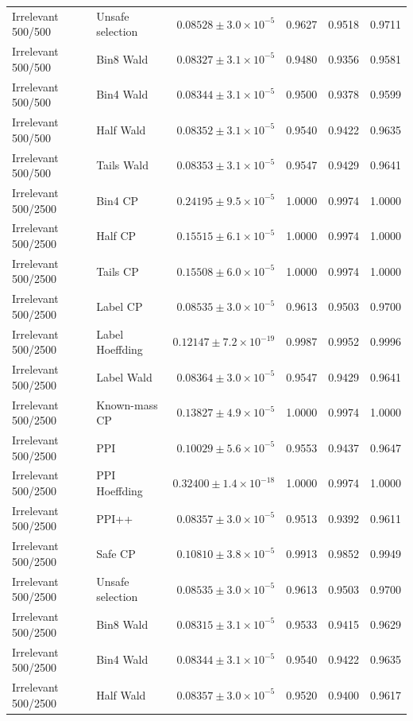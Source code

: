 \begin{longtable}{llrrrr}
Irrelevant 500/500 & Unsafe selection & $0.08528\pm 3.0\times 10^{-5}$ & 0.9627 & 0.9518 & 0.9711 \\
Irrelevant 500/500 & Bin8 Wald & $0.08327\pm 3.1\times 10^{-5}$ & 0.9480 & 0.9356 & 0.9581 \\
Irrelevant 500/500 & Bin4 Wald & $0.08344\pm 3.1\times 10^{-5}$ & 0.9500 & 0.9378 & 0.9599 \\
Irrelevant 500/500 & Half Wald & $0.08352\pm 3.1\times 10^{-5}$ & 0.9540 & 0.9422 & 0.9635 \\
Irrelevant 500/500 & Tails Wald & $0.08353\pm 3.1\times 10^{-5}$ & 0.9547 & 0.9429 & 0.9641 \\
Irrelevant 500/2500 & Bin4 CP & $0.24195\pm 9.5\times 10^{-5}$ & 1.0000 & 0.9974 & 1.0000 \\
Irrelevant 500/2500 & Half CP & $0.15515\pm 6.1\times 10^{-5}$ & 1.0000 & 0.9974 & 1.0000 \\
Irrelevant 500/2500 & Tails CP & $0.15508\pm 6.0\times 10^{-5}$ & 1.0000 & 0.9974 & 1.0000 \\
Irrelevant 500/2500 & Label CP & $0.08535\pm 3.0\times 10^{-5}$ & 0.9613 & 0.9503 & 0.9700 \\
Irrelevant 500/2500 & Label Hoeffding & $0.12147\pm 7.2\times 10^{-19}$ & 0.9987 & 0.9952 & 0.9996 \\
Irrelevant 500/2500 & Label Wald & $0.08364\pm 3.0\times 10^{-5}$ & 0.9547 & 0.9429 & 0.9641 \\
Irrelevant 500/2500 & Known-mass CP & $0.13827\pm 4.9\times 10^{-5}$ & 1.0000 & 0.9974 & 1.0000 \\
Irrelevant 500/2500 & PPI & $0.10029\pm 5.6\times 10^{-5}$ & 0.9553 & 0.9437 & 0.9647 \\
Irrelevant 500/2500 & PPI Hoeffding & $0.32400\pm 1.4\times 10^{-18}$ & 1.0000 & 0.9974 & 1.0000 \\
Irrelevant 500/2500 & PPI++ & $0.08357\pm 3.0\times 10^{-5}$ & 0.9513 & 0.9392 & 0.9611 \\
Irrelevant 500/2500 & Safe CP & $0.10810\pm 3.8\times 10^{-5}$ & 0.9913 & 0.9852 & 0.9949 \\
Irrelevant 500/2500 & Unsafe selection & $0.08535\pm 3.0\times 10^{-5}$ & 0.9613 & 0.9503 & 0.9700 \\
Irrelevant 500/2500 & Bin8 Wald & $0.08315\pm 3.1\times 10^{-5}$ & 0.9533 & 0.9415 & 0.9629 \\
Irrelevant 500/2500 & Bin4 Wald & $0.08344\pm 3.1\times 10^{-5}$ & 0.9540 & 0.9422 & 0.9635 \\
Irrelevant 500/2500 & Half Wald & $0.08357\pm 3.0\times 10^{-5}$ & 0.9520 & 0.9400 & 0.9617 \\

\end{longtable}
